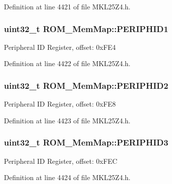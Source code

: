 Definition at line 4421 of file M\+K\+L25\+Z4.\+h.

\subsubsection[{\texorpdfstring{P\+E\+R\+I\+P\+H\+I\+D1}{PERIPHID1}}]{\setlength{\rightskip}{0pt plus 5cm}uint32\+\_\+t R\+O\+M\+\_\+\+Mem\+Map\+::\+P\+E\+R\+I\+P\+H\+I\+D1}\hypertarget{struct_r_o_m___mem_map_ac2959cf5e34f358ff003caebf035e051}{}\label{struct_r_o_m___mem_map_ac2959cf5e34f358ff003caebf035e051}
Peripheral ID Register, offset\+: 0x\+F\+E4 

Definition at line 4422 of file M\+K\+L25\+Z4.\+h.

\subsubsection[{\texorpdfstring{P\+E\+R\+I\+P\+H\+I\+D2}{PERIPHID2}}]{\setlength{\rightskip}{0pt plus 5cm}uint32\+\_\+t R\+O\+M\+\_\+\+Mem\+Map\+::\+P\+E\+R\+I\+P\+H\+I\+D2}\hypertarget{struct_r_o_m___mem_map_a9fa6ff1f979408d3135dd17dbef20050}{}\label{struct_r_o_m___mem_map_a9fa6ff1f979408d3135dd17dbef20050}
Peripheral ID Register, offset\+: 0x\+F\+E8 

Definition at line 4423 of file M\+K\+L25\+Z4.\+h.

\subsubsection[{\texorpdfstring{P\+E\+R\+I\+P\+H\+I\+D3}{PERIPHID3}}]{\setlength{\rightskip}{0pt plus 5cm}uint32\+\_\+t R\+O\+M\+\_\+\+Mem\+Map\+::\+P\+E\+R\+I\+P\+H\+I\+D3}\hypertarget{struct_r_o_m___mem_map_a760f0f060bb682064909ba3c577f7e80}{}\label{struct_r_o_m___mem_map_a760f0f060bb682064909ba3c577f7e80}
Peripheral ID Register, offset\+: 0x\+F\+EC 

Definition at line 4424 of file M\+K\+L25\+Z4.\+h.

